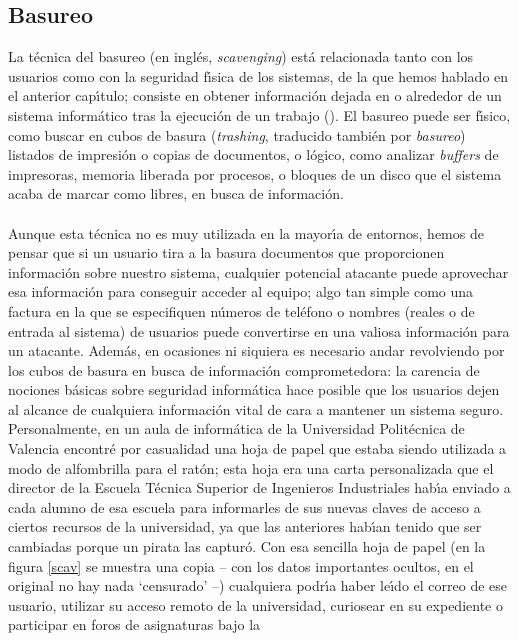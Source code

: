 \subsection{Basureo}
La t\'ecnica del basureo (en ingl\'es, {\it scavenging}) est\'a relacionada
tanto con los usuarios como con la seguridad f\'{\i}sica de los sistemas, de la
que hemos hablado en el anterior cap\'{\i}tulo; consiste en obtener 
informaci\'on dejada en o alrededor de un sistema inform\'atico tras la 
ejecuci\'on de un trabajo (\cite{kn:par81}). El basureo puede ser f\'{\i}sico,
como buscar en cubos de basura ({\it trashing}, traducido tambi\'en por
{\it basureo}) listados de impresi\'on o copias de documentos, o l\'ogico, como
analizar {\it buffers} de impresoras, memoria liberada por procesos, o bloques
de un disco que el sistema acaba de marcar como libres, en busca de 
informaci\'on.\\
\\Aunque esta t\'ecnica no es muy utilizada en la mayor\'{\i}a de entornos, 
hemos de pensar
que si un usuario tira a la basura documentos que proporcionen informaci\'on 
sobre nuestro sistema, cualquier potencial atacante puede aprovechar esa 
informaci\'on para conseguir acceder al equipo; algo tan simple como una 
factura en la que se especifiquen n\'umeros de tel\'efono o nombres (reales o
de entrada al sistema) de usuarios puede convertirse en una valiosa 
informaci\'on para un atacante. Adem\'as, en ocasiones ni siquiera es necesario
andar revolviendo por los cubos de basura en busca de informaci\'on 
comprometedora: la carencia de nociones b\'asicas sobre seguridad inform\'atica
hace posible que los usuarios dejen al alcance de cualquiera informaci\'on
vital de cara a mantener un sistema seguro. Personalmente, en un aula de
inform\'atica de la Universidad Polit\'ecnica de Valencia encontr\'e por 
casualidad una hoja de papel
que estaba siendo utilizada a modo de alfombrilla para el rat\'on; esta hoja
era una carta personalizada que el director de la Escuela T\'ecnica Superior
de Ingenieros Industriales hab\'{\i}a enviado a cada alumno de esa escuela 
para informarles de sus nuevas claves de acceso a ciertos recursos de la
universidad, ya que las anteriores hab\'{\i}an tenido que ser cambiadas porque 
un pirata las captur\'o. Con esa sencilla hoja de papel (en la figura 
\ref{scav} se muestra una copia -- con los datos importantes ocultos, en
el original no hay nada `censurado' --) cualquiera podr\'{\i}a haber le\'{\i}do
el correo de ese usuario, utilizar su acceso remoto de la universidad, 
curiosear en su expediente o participar en foros de asignaturas bajo la 
